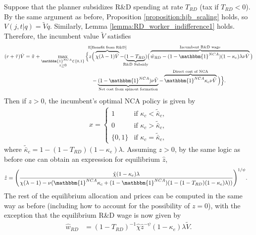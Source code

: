 \documentclass[11pt,english]{article}
\theoremstyle{definition}
\begin{document}
Suppose that the planner subsidizes R\&D spending at rate $T_{RD}$ (tax if $T_{RD} < 0$). By the same argument as before, Proposition \ref{proposition:hjb_scaling} holds, so $V(j,t|q) = \tilde{V}q$. Similarly, Lemma \ref{lemma:RD_worker_indifference1} holds. Therefore, the incumbent value $\tilde{V}$ satisfies
\begin{align}
	(r + \hat{\tau}) \tilde{V} = \tilde{\pi} + \max_{\substack{\mathbbm{1}^{NCA} \in \{0,1\} \\ z \ge 0}} \Big\{z &\Big( \overbrace{\chi (\lambda - 1) \tilde{V}}^{\mathclap{\mathbb{E}[\textrm{Benefit from R\&D}]}}- (\underbrace{1-T_{RD}}_{\mathclap{\text{R\&D Subsidy}}}) \big( \overbrace{\hat{w}_{RD} - (1-\mathbbm{1}^{NCA})(1-\kappa_e)\lambda \nu \tilde{V}}^{\mathclap{\text{Incumbent R\&D wage}}}\big) \label{eq:hjb_incumbent_RDsubsidy_appendix} \nonumber \\ 
	&-  \underbrace{(1-\mathbbm{1}^{NCA}) \nu \tilde{V}}_{\mathclap{\text{Net cost from spinout formation}}} - \overbrace{\mathbbm{1}^{NCA} \kappa_{c} \nu \tilde{V}}^{\mathclap{\text{Direct cost of NCA}}}\Big) \Big\}. 
\end{align}
Then if $z > 0$, the incumbent's optimal NCA policy is given by 
\begin{align}
	x = \begin{cases}
		1 & \textrm{if } \kappa_{c} < \tilde{\bar{\kappa}}_c,  \\
		0 & \textrm{if } \kappa_{c} > \tilde{\bar{\kappa}}_c, \\
		\{0,1\} & \textrm{if } \kappa_c = \tilde{\bar{\kappa}}_c,
	\end{cases} \label{eq:nca_policy_RDsubsidy}
\end{align}
where $\tilde{\bar{\kappa}}_c = 1 - (1-T_{RD})(1-\kappa_e)\lambda$. Assuming $z > 0$, by the same logic as before one can obtain an expression for equilibrium $\hat{z}$, 
\begin{align}
	\hat{z} &= \Bigg( \frac{\hat{\chi} (1-\kappa_{e}) \lambda}{\chi(\lambda -1) - \nu (\mathbbm{1}^{NCA}\kappa_c + (1-\mathbbm{1}^{NCA})(1 - (1-T_{RD})(1-\kappa_e)\lambda)) } \Bigg)^{1/\psi}. \label{eq:effort_entrant_RDsubsidy_appendix}
\end{align}
The rest of the equilibrium allocation and prices can be computed in the same way as before (including how to account for the possibility of $z = 0$), with the exception that the equilibrium R\&D wage is now given by 
\begin{align}
	\hat{w}_{RD} &= (1-T_{RD})^{-1}\hat{\chi} \hat{z}^{-\psi} (1-\kappa_e) \lambda \tilde{V}. \label{eq:wage_rd_labor_RDsubsidy_appendix}
\end{align}
\end{document}
